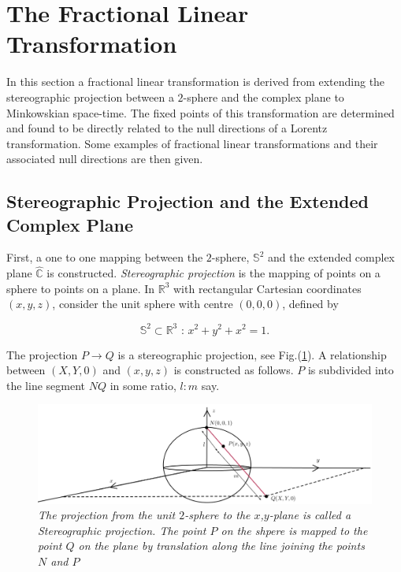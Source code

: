 \section{The Fractional Linear Transformation}

In this section a fractional linear transformation is derived from extending the stereographic projection between a $2$-sphere and the complex plane to Minkowskian space-time. The fixed points of this transformation are determined and found to be directly related to the null directions of a Lorentz transformation. Some examples of fractional linear transformations and their associated null directions are then given. 

\subsection{Stereographic Projection and the Extended Complex Plane}\label{Section_Stereographic_Extended_Complex}

First, a one to one mapping between the $2$-sphere, $\mathbb{S}^2$ and the extended complex plane $\hat{\mathbb{C}}$ is constructed. \textit{Stereographic projection} is the mapping of points on a sphere to points on a plane. In $\mathbb{R}^3$ with rectangular Cartesian coordinates $(x, y, z)$, consider the unit sphere with centre $(0,0,0)$, defined by

\begin{equation*}
\mathbb{S}^2 \subset \mathbb{R}^3 \text{ : } x^2 + y^2 + x^2 = 1.
\end{equation*}

\noindent The projection $P \rightarrow Q$ is a stereographic projection, see Fig.(\ref{Stereographic_Projecttion_Fig}). A relationship between $(X,Y,0)$ and $(x,y,z)$ is constructed as follows. $P$ is subdivided into the line segment $NQ$ in some ratio, $l:m$ say. 

\begin{figure}[h!]
\begin{center}
\caption{\textit{The projection from the unit $2$-sphere to the $x$,$y$-plane is called a Stereographic projection. The point $P$ on the shpere is mapped to the point $Q$ on the plane by translation along the line joining the points $N$ and $P$}}
\label{Stereographic_Projecttion_Fig}
\includegraphics[scale=0.55]{figs/4_1.jpg}
\end{center}
\end{figure}

